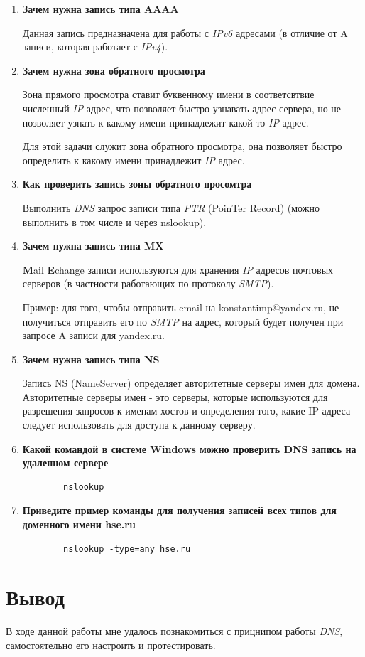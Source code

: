\documentclass[a4paper]{article}
\begin{document}
  \begin{enumerate}
    \item {
      \textbf{Зачем нужна запись типа AAAA}

      Данная запись предназначена для работы с \textit{IPv6} адресами (в отличие от
      A записи, которая работает с \textit{IPv4}).
    }
    \item {
      \textbf{Зачем нужна зона обратного просмотра}

      Зона прямого просмотра ставит буквенному имени в соответсвтвие численный \textit{IP}
      адрес, что позволяет быстро узнавать адрес сервера, но не позволяет узнать к какому
      имени принадлежит какой-то \textit{IP} адрес.

      Для этой задачи служит зона обратного просмотра, она позволяет быстро определить
      к какому имени принадлежит \textit{IP} адрес.
    }
    \item {
      \textbf{Как проверить запись зоны обратного просомтра}

      Выполнить \textit{DNS} запрос записи типа \textit{PTR} (PoinTer Record) (можно
      выполнить в том числе и через nslookup).
    }
    \item {
      \textbf{Зачем нужна запись типа MX}

      \textbf{M}ail \textbf{E}change записи используются для хранения \textit{IP}
      адресов почтовых серверов (в частности работающих по протоколу \textit{SMTP}).

      Пример: для того, чтобы отправить email на konstantimp@yandex.ru, не получиться
      отправить его по \textit{SMTP} на адрес, который будет получен при запросе A
      записи для yandex.ru.
    }
    \item {
      \textbf{Зачем нужна запись типа NS}

      Запись NS (NameServer) определяет авторитетные серверы имен для домена. Авторитетные серверы имен - это серверы, которые используются для разрешения запросов к именам хостов и определения того, какие IP-адреса следует использовать для доступа к данному серверу.
    }
    \item {
      \textbf{Какой командой в системе Windows можно проверить DNS запись на удаленном сервере}

      \begin{verbatim}
        nslookup
      \end{verbatim}
    }
    \item {
      \textbf{Приведите пример команды для получения записей всех типов для доменного имени hse.ru}

      \begin{verbatim}
        nslookup -type=any hse.ru
      \end{verbatim}
    }
  \end{enumerate}

  \section{Вывод}

  В ходе данной работы мне удалось познакомиться с прицнипом работы \textit{DNS},
  самостоятельно его настроить и протестировать.
\end{document}
